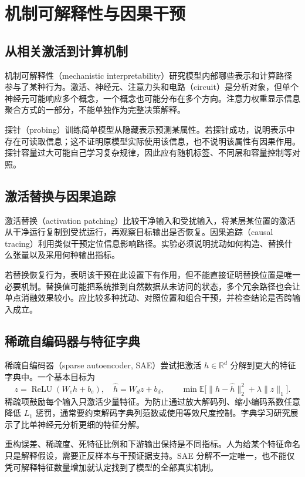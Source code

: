 \setcounter{chapter}{20} %
\chapter{机制可解释性与因果干预}
\label{ch:interpretability}

\section{从相关激活到计算机制}

机制可解释性（mechanistic interpretability）研究模型内部哪些表示和计算路径参与了某种行为。激活、神经元、注意力头和电路（circuit）是分析对象，但单个神经元可能响应多个概念，一个概念也可能分布在多个方向。注意力权重显示信息聚合方式的一部分，不能单独作为完整决策解释。

探针（probing）训练简单模型从隐藏表示预测某属性。若探针成功，说明表示中存在可读取信息；这不证明原模型实际使用该信息，也不说明该属性有因果作用。探针容量过大可能自己学习复杂规律，因此应有随机标签、不同层和容量控制等对照。

\section{激活替换与因果追踪}

激活替换（activation patching）比较干净输入和受扰输入，将某层某位置的激活从干净运行复制到受扰运行，再观察目标输出是否恢复。因果追踪（causal tracing）利用类似干预定位信息影响路径。实验必须说明扰动如何构造、替换什么张量以及采用何种输出指标。

若替换恢复行为，表明该干预在此设置下有作用，但不能直接证明替换位置是唯一必要机制。替换值可能把系统推到自然数据从未访问的状态，多个冗余路径也会让单点消融效果较小。应比较多种扰动、对照位置和组合干预，并检查结论是否跨输入成立。

\section{稀疏自编码器与特征字典}

稀疏自编码器（sparse autoencoder, SAE）尝试把激活 $h\in\mathbb R^d$ 分解到更大的特征字典中。一个基本目标为
\[
z=\operatorname{ReLU}(W_eh+b_e),\quad \widehat h=W_dz+b_d,\qquad
\min\mathbb E\bigl[\|h-\widehat h\|_2^2+\lambda\|z\|_1\bigr].
\]
稀疏项鼓励每个输入只激活少量特征。为防止通过放大解码列、缩小编码系数任意降低 $L_1$ 惩罚，通常要约束解码字典列范数或使用等效尺度控制。字典学习研究展示了比单神经元分析更细的特征分解\cite{sae}。

重构误差、稀疏度、死特征比例和下游输出保持是不同指标。人为给某个特征命名只是解释假设，需要正反样本与干预证据支持。SAE 分解不一定唯一，也不能仅凭可解释特征数量增加就认定找到了模型的全部真实机制。

